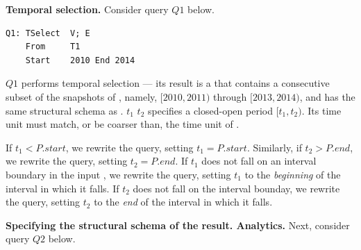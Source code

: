 
{\bf Temporal selection.}  Consider query $Q1$ below.  

\begin{verbatim}
Q1: TSelect  V; E
    From     T1
    Start    2010 End 2014
\end{verbatim}

$Q1$ performs temporal selection --- its result is a \tg that contains
a consecutive subset of the snapshots of , namely, $[2010,
  2011)$ through $[2013, 2014)$, and has the same structural schema as
    .   $t_1$  $t_2$ specifies a
    closed-open period $[t_1, t_2)$.  Its time unit must match, or be
      coarser than, the time unit of .

If $t_1 < P.start$, we rewrite the query, setting $t_1 = P.start$.
Similarly, if $t_2 > P.end$, we rewrite the query, setting $t_2 =
P.end$.  If $t_1$ does not fall on an interval boundary in the input
\tg, we rewrite the query, setting $t_1$ to the {\em beginning} of the
interval in which it falls.  If $t_2$ does not fall on the interval
bounday, we rewrite the query, setting $t_2$ to the {\em end} of the
interval in which it falls.


{\bf Specifying the structural schema of the result.  Analytics.}
Next, consider query $Q2$ below.

